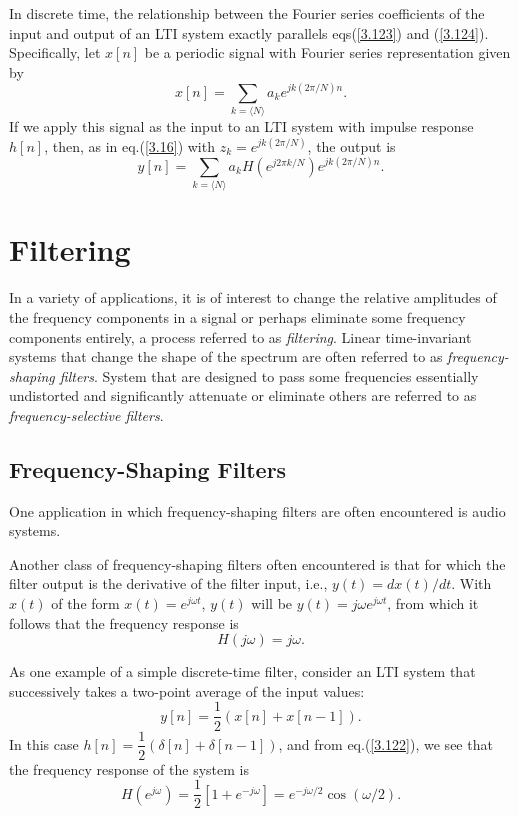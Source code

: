 \documentclass[a4paper,10pt,twoside]{book}
\begin{document}
In discrete time, the relationship between the Fourier series coefficients of the input and output of an LTI system exactly parallels eqs\;(\ref{3.123}) and (\ref{3.124}). Specifically, let $x[n]$ be a periodic signal with Fourier series representation given by $$x[n]=\sum_{k=\langle N\rangle}a_ke^{jk(2\pi/N)n}.$$ If we apply this signal as the input to an LTI system with impulse response $h[n]$, then, as in eq.\;(\ref{3.16}) with $z_k=e^{jk(2\pi/N)}$, the output is
\begin{equation}
    y[n]=\sum_{k=\langle N\rangle}a_{k}H(e^{j2\pi k/N})e^{jk(2\pi/N)n}.
    \label{3.131}
\end{equation}

\section{Filtering}
\label{section:3.9}

In a variety of applications, it is of interest to change the relative amplitudes of the frequency components in a signal or perhaps eliminate some frequency components entirely, a process referred to as \textit{filtering}. Linear time-invariant systems that change the shape of the spectrum are often referred to as \textit{frequency-shaping filters}. System that are designed to pass some frequencies essentially undistorted and significantly attenuate or eliminate others are referred to as \textit{frequency-selective filters}.

\subsection{Frequency-Shaping Filters}

One application in which frequency-shaping filters are often encountered is audio systems.

Another class of frequency-shaping filters often encountered is that for which the filter output is the derivative of the filter input, i.e., $y(t)=dx(t)/dt$. With $x(t)$ of the form $x(t)=e^{j\omega t}$, $y(t)$ will be $y(t)=j\omega e^{j\omega t}$, from which it follows that the frequency response is
\begin{equation}
    H(j\omega)=j\omega.
    \label{3.137}
\end{equation}

As one example of a simple discrete-time filter, consider an LTI system that successively takes a two-point average of the input values:
\begin{equation}
    y[n]=\dfrac12(x[n]+x[n-1]).
    \label{3.138}
\end{equation}
In this case $h[n]=\dfrac12(\delta[n]+\delta[n-1])$, and from eq.\;(\ref{3.122}), we see that the frequency response of the system is
\begin{equation}
    H(e^{j\omega})=\frac12[1+e^{-j\omega}]=e^{-j\omega/2}\cos(\omega/2).
    \label{3.139}
\end{equation}
\end{document}
